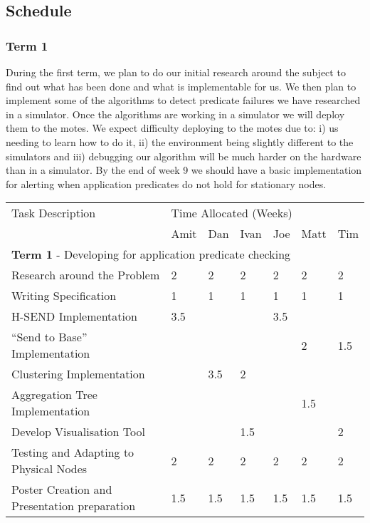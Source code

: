 \documentclass[a4paper]{article}
\begin{document}
\subsection{Schedule}

\subsubsection{Term 1}

During the first term, we plan to do our initial research around the subject to
find out what has been done and what is implementable for us. We then plan to
implement some of the algorithms to detect predicate failures we have researched in a
simulator. Once the algorithms are working in a simulator we will deploy them to
the motes. We expect difficulty deploying to the motes due to: i) us needing to
learn how to do it, ii) the environment being slightly different to the
simulators and iii) debugging our algorithm will be much harder on the hardware
than in a simulator. By the end of week 9 we should have a basic implementation
for alerting when application predicates do not hold for stationary nodes.

\begin{table}[H]
	\centering
	\begin{tabular}{| l | l | l | l | l | l | l |}
	\hline
	Task Description & \multicolumn{6}{|l|}{Time Allocated (Weeks)}\\
	~ & Amit & Dan & Ivan & Joe & Matt & Tim \\
	\hline
	\hline
	\multicolumn{7}{|l|}{\textbf{Term 1} - Developing for application predicate checking} \\
	\hline


	Research around the Problem & 2 & 2 & 2 & 2 & 2 & 2\\
	Writing Specification & 1 & 1 & 1 & 1 & 1 & 1\\
	H-SEND Implementation & 3.5 & ~ & ~ & 3.5 & ~ & ~\\
	``Send to Base'' Implementation & ~ & ~ & ~ & ~ & 2 & 1.5\\
	Clustering Implementation & ~ & 3.5 & 2 & ~ & ~ & ~\\
	Aggregation Tree Implementation & ~ & ~ & ~ & ~ & 1.5 & ~\\
	Develop Visualisation Tool & ~ & ~ & 1.5 & ~ & ~ & 2\\
	Testing and Adapting to Physical Nodes & 2 & 2 & 2 & 2 & 2 & 2\\
	Poster Creation and Presentation preparation & 1.5 & 1.5 & 1.5 & 1.5 & 1.5 & 1.5\\

	\hline
	
	\end{tabular}
\end{table}
\end{document}
